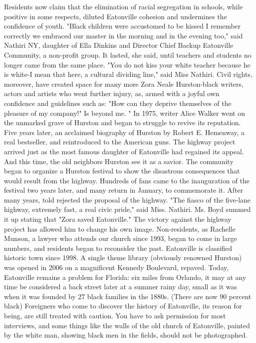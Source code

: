 Residents now claim that the elimination of racial segregation in schools, while positive in some respects, diluted Eatonville cohesion and undermines the confidence of youth.
"Black children were accustomed to be kissed I remember correctly we embraced our master in the morning and in the evening too," said Nathiri NY, daughter of Ella Dinkins and Director Chief Backup Eatonville Community, a non-profit group.
It lasted, she said, until teachers and students no longer came from the same place.
"You do not kiss your white teacher because he is white-I mean that here, a cultural dividing line," said Miss Nathiri.
Civil rights, moreover, have created space for many more Zora Neale Hurston-black writers, actors and artists who went further injury, as, armed with a joyful own confidence and guidelines such as: "How can they deprive themselves of the pleasure of my company!"
Is beyond me. "
In 1975, writer Alice Walker went on the unmarked grave of Hurston and began to struggle to revive its reputation.
Five years later, an acclaimed biography of Hurston by Robert E. Hemenway, a real bestseller, and reintroduced to the American guns.
The highway project arrived just as the most famous daughter of Eatonville had regained its appeal.
And this time, the old neighbors Hurston see it as a savior.
The community began to organize a Hurston festival to show the disastrous consequences that would result from the highway.
Hundreds of fans came to the inauguration of the festival two years later, and many return in January, to commemorate it.
After many years, told rejected the proposal of the highway.
"The fiasco of the five-lane highway, extremely fast, a real civic pride," said Miss. Nathiri.
Ms. Boyd summed it up stating that "Zora saved Eatonville."
The victory against the highway project has allowed him to change his own image.
Non-residents, as Rachelle Munson, a lawyer who attends our church since 1993, began to come in large numbers, and residents began to reconsider the past.
Eatonville is classified historic town since 1998.
A single theme library (obviously renowned Hurston) was opened in 2006 on a magnificent Kennedy Boulevard, repaved.
Today, Eatonville remains a problem for Florida: six miles from Orlando, it may at any time be considered a back street later at a summer rainy day, small as it was when it was founded by 27 black families in the 1880s.
(There are now 90 percent black)
Foreigners who come to discover the history of Eatonville, its reason for being, are still treated with caution.
You have to ask permission for most interviews, and some things like the walls of the old church of Eatonville, painted by the white man, showing black men in the fields, should not be photographed.
